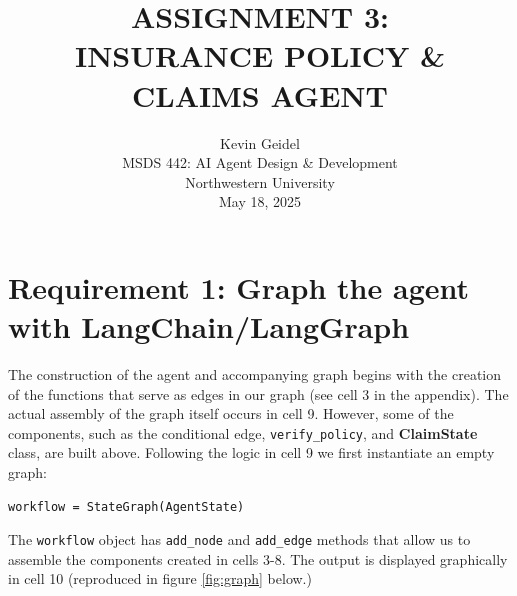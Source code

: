 \documentclass[11pt,letterpaper]{article}
\begin{document}
\selectfont
{}
\doublespacing
\setlength{\droptitle}{1in} 

\title{\large{ASSIGNMENT 3: \\ INSURANCE POLICY \& CLAIMS AGENT \\\vspace{1.2in}}}

\author{
Kevin Geidel \\
MSDS 442: AI Agent Design \& Development \\
Northwestern University \\
May 18, 2025 \\
}

\date{}
\maketitle
\thispagestyle{empty}	
\clearpage
\setcounter{page}{1}


\section*{Requirement 1: Graph the agent with LangChain/LangGraph}
\tab The construction of the agent and accompanying graph begins with the creation of the functions that serve as edges in our graph (see cell 3 in the appendix). 
The actual assembly of the graph itself occurs in cell 9. However, some of the components, such as the conditional edge, \texttt{verify\_policy}, and \textbf{ClaimState} class,
are built above. Following the logic in cell 9 we first instantiate an empty graph:

\begin{verbatim}
workflow = StateGraph(AgentState)
\end{verbatim}

The \texttt{workflow} object has \texttt{add\_node} and \texttt{add\_edge} methods that allow us to assemble the 
components created in cells 3-8. The output is displayed graphically in cell 10 (reproduced in figure \ref{fig:graph} below.)
\end{document}
